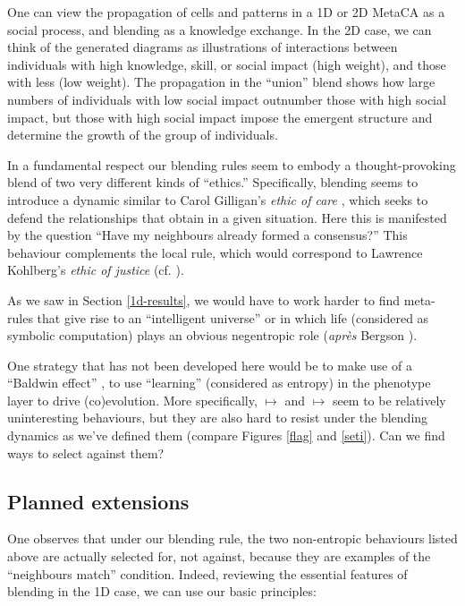 \documentclass{AISB2008}
\makeatletter
\renewcommand{\boxed}[1]{\text{\fboxsep=.2em\fbox{\m@th$\displaystyle#1$}}}
\newcommand{\mystrut}{\vphantom{b\gamma}}
\makeatother
\begin{document}
One can view the propagation of cells and patterns in a 1D or 2D
MetaCA as a social process, and blending as a knowledge exchange.  In
the 2D case, we can think of the generated diagrams as illustrations
of interactions between individuals with high knowledge, skill, or
social impact (high weight), and those with less (low weight).  The
propagation in the ``union'' blend shows how large numbers of
individuals with low social impact outnumber those with high social
impact, but those with high social impact impose the emergent
structure and determine the growth of the group of individuals.

In a fundamental respect our blending rules seem to embody a
thought-provoking blend of two very different kinds of ``ethics.''
Specifically, blending seems to introduce a dynamic similar to Carol
Gilligan's \emph{ethic of care} \cite{gilligan1982different}, which
seeks to defend the relationships that obtain in a given situation.
Here this is manifested by the question ``Have my neighbours already
formed a consensus?''  This behaviour complements the local
rule, which would correspond to Lawrence Kohlberg’s \emph{ethic of
  justice} (cf. \cite{benhabib1985generalized}).

As we saw in Section \ref{1d-results}, we would have to work harder to
find meta-rules that give rise to an ``intelligent universe'' or in
which life (considered as symbolic computation) plays an obvious
negentropic role (\emph{apr\`es} Bergson \cite{bergson1912creative}).

One strategy that has not been developed here would be to make use of
a ``Baldwin effect'' \cite{baldwin-effect,weber2003evolution}, to use
``learning'' (considered as entropy) in the phenotype layer to drive
(co)evolution.  More specifically,
\boxed{0\mystrut}\boxed{0\mystrut}\boxed{0\mystrut} $\mapsto$
\boxed{0\mystrut} and
\boxed{1\mystrut}\boxed{1\mystrut}\boxed{1\mystrut} $\mapsto$
\boxed{1\mystrut} seem to be relatively uninteresting behaviours, but
they are also hard to resist under the blending dynamics as we've
defined them (compare Figures \ref{flag} and \ref{seti}).  Can we find
ways to select against them?

\subsection{Planned extensions}

One observes that under our blending rule, the two non-entropic
behaviours listed above are actually selected for, not against,
because they are examples of the ``neighbours match'' condition.
Indeed, reviewing the essential features of blending in the 1D case,
we can use our basic principles:
\end{document}
